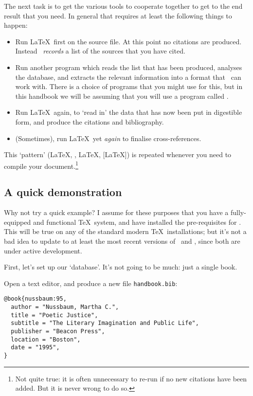 The next task is to get the various tools to cooperate together to get
to the end result that you need. In general that requires at least the
following things to happen:
\begin{itemize}
\item Run \LaTeX\ first on the source file. At this point no citations
  are produced. Instead \biblatex\ \emph{records} a list of the
  sources that you have cited.
\item Run another program which reads the list that has been produced,
  analyses the database, and extracts the relevant information into a
  format that \biblatex\ can work with. There is a choice of programs
  that you might use for this, but in this handbook we will be
  assuming that you will use a program called .
\item Run \LaTeX\ again, to `read in' the data that has now been put
  in digestible form, and produce the citations and bibliography.
\item (Sometimes), run \LaTeX\ yet \emph{again} to finalise
  cross-references.
\end{itemize}

This `pattern' (\LaTeX, , \LaTeX, [\LaTeX]) is repeated
whenever you need to compile your document.\footnote{Not quite true:
  it is often unnecessary to re-run  if no new
  citations have been added. But it is never wrong to do so.}

\subsection{A quick demonstration\label{neophyte:example}}

Why not try a quick example? I assume for these purposes that you have
a fully-equipped and functional \TeX\ system, and have installed the
pre-requisites for \biblatex. This will be true on any of the standard
modern \TeX\ installations; but it's not a bad idea to update to at
least the most recent versions of \biblatex\ and ,
since both are under active development.

First, let's set up our `database'. It's not going to be much: just a
single book.

Open a text editor, and produce a new file
\texttt{handbook.bib}:

\begin{verbatim}
@book{nussbaum:95,
  author = "Nussbaum, Martha C.",
  title = "Poetic Justice",
  subtitle = "The Literary Imagination and Public Life",
  publisher = "Beacon Press",
  location = "Boston",
  date = "1995",
}
\end{verbatim}

